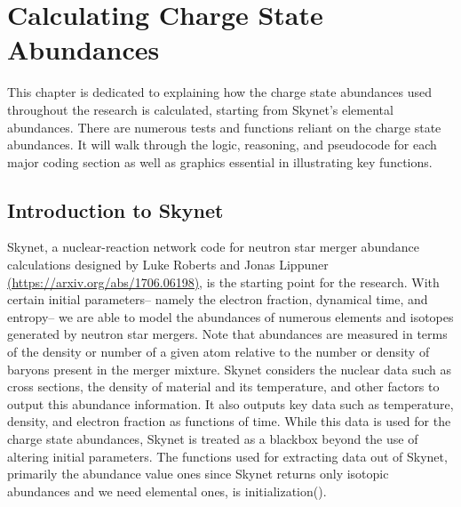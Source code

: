 \documentclass[11pt,a4paper]{article}
\begin{document}
\section{Calculating Charge State Abundances}

This chapter is dedicated to explaining how the charge state abundances used throughout the research is calculated, starting from Skynet’s elemental abundances. There are numerous tests and functions reliant on the charge state abundances. It will walk through the logic, reasoning, and pseudocode for each major coding section as well as graphics essential in illustrating key functions. 

\subsection{Introduction to Skynet}

Skynet, a nuclear-reaction network code for neutron star merger abundance calculations designed by Luke Roberts and Jonas Lippuner \url{(https://arxiv.org/abs/1706.06198)}, is the starting point for the research. With certain initial parameters-- namely the electron fraction, dynamical time, and entropy-- we are able to model the abundances of numerous elements and isotopes generated by neutron star mergers. Note that abundances are measured in terms of the density or number of a given atom relative to the number or density of baryons present in the merger mixture. Skynet considers the nuclear data such as cross sections, the density of material and its temperature, and other factors to output this abundance information. It also outputs key data such as temperature, density, and electron fraction as functions of time. While this data is used for the charge state abundances, Skynet is treated as a blackbox beyond the use of altering initial parameters. The functions used for extracting data out of Skynet, primarily the abundance value ones since Skynet returns only isotopic abundances and we need elemental ones, is initialization().
\end{document}
